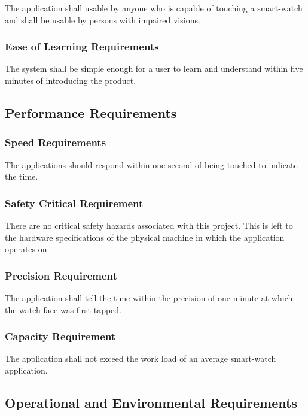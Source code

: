 \documentclass[12pt, titlepage]{article}
\begin{document}
The application shall usable by anyone who is capable of touching a smart-watch and shall be usable by persons with impaired visions. 

\subsubsection{Ease of Learning Requirements}

The system shall be simple enough for a user to learn and understand within five minutes of introducing the product.

\subsection{Performance Requirements}

\subsubsection{Speed Requirements}

The applications should respond within one second of being touched to indicate the time. %

\subsubsection{Safety Critical Requirement}

There are no critical safety hazards associated with this project. This is left to the hardware specifications of the physical machine in which the application operates on. 

\subsubsection{Precision Requirement}

The application shall tell the time within the precision of one minute at which the watch face was first tapped.

\subsubsection{Capacity Requirement}

The application shall not exceed the work load of an average smart-watch application.

\subsection{Operational and Environmental Requirements}
\end{document}
